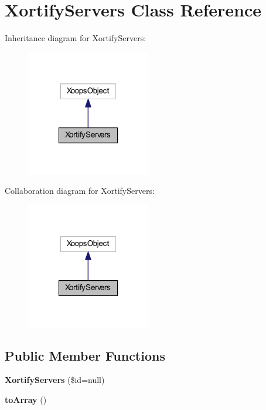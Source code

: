 \hypertarget{class_xortify_servers}{\section{Xortify\-Servers Class Reference}
\label{class_xortify_servers}
}


Inheritance diagram for Xortify\-Servers\-:
\nopagebreak
\begin{figure}[H]
\begin{center}
\leavevmode
\includegraphics[width=154pt]{class_xortify_servers__inherit__graph}
\end{center}
\end{figure}


Collaboration diagram for Xortify\-Servers\-:
\nopagebreak
\begin{figure}[H]
\begin{center}
\leavevmode
\includegraphics[width=154pt]{class_xortify_servers__coll__graph}
\end{center}
\end{figure}
\subsection*{Public Member Functions}
\begin{DoxyCompactItemize}
\item 
\hypertarget{class_xortify_servers_ab20b47ee40f09c78cbddcd47b1495de6}{{\bfseries Xortify\-Servers} (\$id=null)}\label{class_xortify_servers_ab20b47ee40f09c78cbddcd47b1495de6}

\item 
\hypertarget{class_xortify_servers_a658defb34762c8f40085aec87e16ba1a}{{\bfseries to\-Array} ()}\label{class_xortify_servers_a658defb34762c8f40085aec87e16ba1a}

\end{DoxyCompactItemize}


